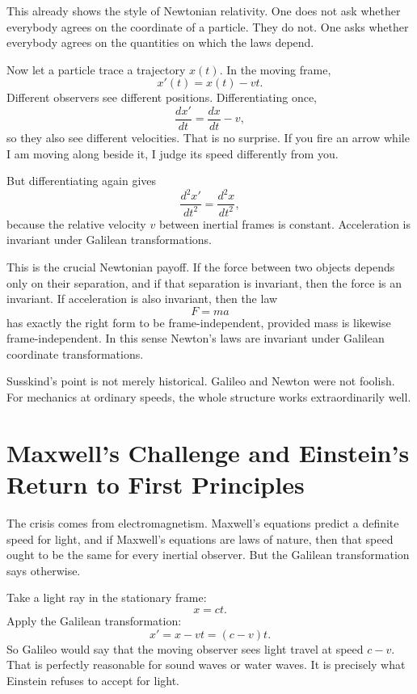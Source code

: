 This already shows the style of Newtonian relativity. One does not ask whether everybody agrees on the coordinate of a particle. They do not. One asks whether everybody agrees on the quantities on which the laws depend.

Now let a particle trace a trajectory \(x(t)\). In the moving frame,
\begin{equation}
x'(t)=x(t)-vt.
\end{equation}
Different observers see different positions. Differentiating once,
\begin{equation}
\frac{dx'}{dt}=\frac{dx}{dt}-v,
\end{equation}
so they also see different velocities. That is no surprise. If you fire an arrow while I am moving along beside it, I judge its speed differently from you.

But differentiating again gives
\begin{equation}
\frac{d^2x'}{dt^2}=\frac{d^2x}{dt^2},
\end{equation}
because the relative velocity \(v\) between inertial frames is constant. Acceleration is invariant under Galilean transformations.

This is the crucial Newtonian payoff. If the force between two objects depends only on their separation, and if that separation is invariant, then the force is an invariant. If acceleration is also invariant, then the law
\begin{equation}
F=ma
\end{equation}
has exactly the right form to be frame-independent, provided mass is likewise frame-independent. In this sense Newton's laws are invariant under Galilean coordinate transformations.

Susskind's point is not merely historical. Galileo and Newton were not foolish. For mechanics at ordinary speeds, the whole structure works extraordinarily well.

\section{Maxwell's Challenge and Einstein's Return to First Principles}

The crisis comes from electromagnetism. Maxwell's equations predict a definite speed for light, and if Maxwell's equations are laws of nature, then that speed ought to be the same for every inertial observer. But the Galilean transformation says otherwise.

Take a light ray in the stationary frame:
\begin{equation}
x=ct.
\end{equation}
Apply the Galilean transformation:
\begin{equation}
x'=x-vt=(c-v)t.
\end{equation}
So Galileo would say that the moving observer sees light travel at speed \(c-v\). That is perfectly reasonable for sound waves or water waves. It is precisely what Einstein refuses to accept for light.

